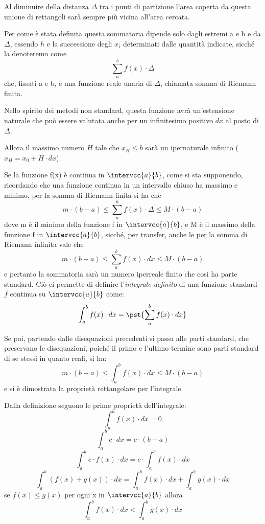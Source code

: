 Al diminuire della distanza \(\Delta\) tra i punti di partizione 
l'area coperta da questa unione di rettangoli sarà sempre più vicina all'area 
cercata.

Per come è stata definita questa sommatoria dipende solo dagli estremi a e b 
e da \(\Delta\), essendo \(h\) e la successione degli \(x_i\) determinati dalle 
quantità indicate, sicché la denoteremo come 
\[\sum_a^b f(x) \cdot\Delta\] 
che, fissati a e b, è una 
funzione reale unaria di \(\Delta\), chiamata somma di Riemann finita. 

Nello spirito dei metodi non standard, questa funzione avrà un'estensione 
naturale che può essere valutata anche per un infinitesimo positivo \(dx\) 
al posto di \(\Delta\).

Allora il massimo numero \(H\) tale che \(x_H \le b\) sarà un ipernaturale 
infinito (\(x_H = x_0 + H \cdot dx\)).


Se la funzione f(x) è continua in \(\intervcc{a}{b}\), come si sta 
supponendo, 
ricordando che una funzione continua in un intervallo chiuso ha massimo e 
minimo, per la somma di Riemann finita si ha che 
\[m\cdot(b - a) \le \sum_a^b f(x) \cdot\Delta \le M\cdot(b - a)\] 
dove m è il minimo della funzione f in \(\intervcc{a}{b}\), e 
M è il massimo della funzione f in \(\intervcc{a}{b}\), sicché, per transfer, 
anche le per 
la somma di Riemann infinita vale che 
\[m \cdot (b - a) \le  \sum_a^b f(x) \cdot dx  \le M\cdot(b - a)\]
e pertanto la sommatoria sarà un numero iperreale finito che così ha parte 
standard. 
Ciò ci permette di definire l'\emph{integrale definito} di una funzione 
standard \(f\) continua su \(\intervcc{a}{b}\) come:
\[\int_a^b f(x) \cdot dx = \pst{\sum_a^b f(x) \cdot dx}\]

Se poi, 
partendo dalle disequazioni precedenti si passa alle parti standard, che 
preservano le disequazioni, poiché il primo e l'ultimo termine sono parti 
standard di se stessi in quanto reali, si ha: 
\[m \cdot(b - a) \le  \int_a^b f(x) \cdot dx  \le M\cdot(b - a)\] 
e si è dimostrata la proprietà rettangolare per l'integrale.

Dalla definizione seguono le prime proprietà dell'integrale:
\[\int_a^a f(x) \cdot dx=0\] 
\[\int_a^b c \cdot dx = c \cdot (b-a)\] 
\[\int_a^b c \cdot f(x) \cdot dx = c\cdot\int_a^b f(x) \cdot dx\] 
\[\int_a^b (f(x)+g(x))\cdot dx = 
  \int_a^b f(x) \cdot dx + \int_a^b g(x)\cdot dx\]
se \(f(x) \le g(x)\) per ogni x in \(\intervcc{a}{b}\) allora 
\[\int_a^b f(x) \cdot dx < \int_a^b g(x)\cdot dx\]

